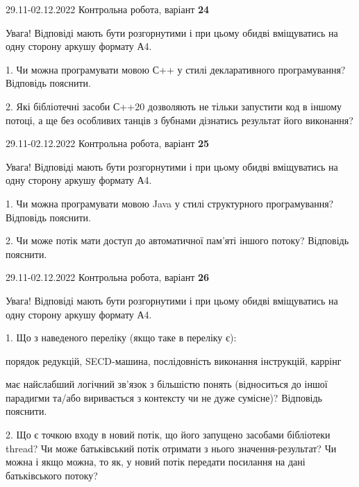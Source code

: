 \documentclass[11pt, ukrainian]{article}
\begin{document}
\vspace{4mm}



{29.11-02.12.2022 Контрольна робота, варіант  \No \textbf { 24 }\par}
Увага! Відповіді мають бути розгорнутими і при цьому обидві вміщуватись на одну сторону аркушу формату А4.

{
\begin {large}

1. Чи можна програмувати мовою С++ у стилі декларативного програмування? Відповідь пояснити.%

2. Які бібліотечні засоби С++20 дозволяють не тільки запустити код в іншому потоці, а ще без особливих танців з бубнами дізнатись результат його виконання?

\end {large}}

\vspace{4mm}
\newpage
{29.11-02.12.2022 Контрольна робота, варіант  \No \textbf { 25 }\par}
Увага! Відповіді мають бути розгорнутими і при цьому обидві вміщуватись на одну сторону аркушу формату А4.

{
\begin {large}

1. Чи можна програмувати мовою Java у стилі структурного програмування? Відповідь пояснити.%

2. Чи може потік мати доступ до автоматичної пам’яті іншого потоку? Відповідь пояснити.

\end {large}}

\vspace{4mm}



{29.11-02.12.2022 Контрольна робота, варіант  \No \textbf { 26 }\par}
Увага! Відповіді мають бути розгорнутими і при цьому обидві вміщуватись на одну сторону аркушу формату А4.

{
\begin {large}

1. Що з наведеного переліку (якщо таке в переліку є):

\vspace{4mm}
 порядок редукцій, SECD-машина, послідовність виконання інструкцій, каррінг

\vspace{4mm}
має найслабший логічний зв’язок з більшістю понять (відноситься до іншої парадигми та/або виривається з контексту чи не дуже сумісне)? Відповідь пояснити.


2. Що є точкою входу в новий потік, що його запущено засобами бібліотеки thread? Чи може батьківський потік отримати з нього значення-результат? Чи можна і якщо можна, то як, у новий потік передати посилання на дані батьківського потоку?

\end {large}}
\end{document}
